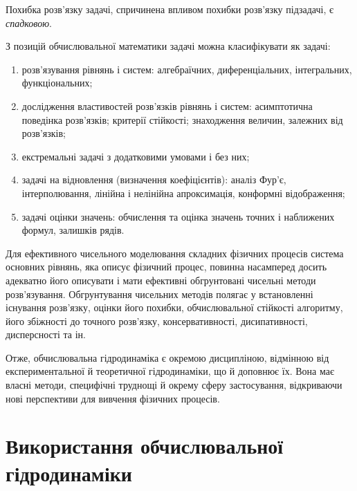 \begin{definition}
    Похибка розв'язку задачі, спричинена впливом похибки роз\-в'яз\-ку підзадачі, є \textit{спадковою}.
\end{definition}

З позицій обчислювальної математики задачі можна класифікувати як задачі: 
\begin{enumerate}
    \item розв'язування рівнянь і систем: алгебраїчних, диференціальних, інтегральних, функціональних; 
    \item дослідження властивостей розв'язків рівнянь і систем: асимптотична поведінка розв'язків; критерії стійкості; знаходження величин, залежних від розв'язків; 
    \item екстремальні задачі з додатковими умовами і без них; 
    \item задачі на відновлення (визначення коефіцієнтів): аналіз Фур'є, інтерполювання, лінійна і нелінійна апроксимація, конформні відображення;
    \item задачі оцінки значень: обчислення та оцінка значень точних і наближених формул, залишків рядів.
\end{enumerate}

Для ефективного чисельного моделювання складних фізичних процесів система основних рівнянь, яка описує фізичний процес, повинна насамперед досить адекватно його описувати і мати ефективні обгрунтовані чисельні методи розв'язування. Обгрунтування чисельних методів полягає у встановленні існування розв'язку, оцінки його похибки, обчислювальної стійкості алгоритму, його збіжності до точного розв'язку, консервативності, дисипативності, дисперсності та ін. \medskip

Отже, обчислювальна гідродинаміка є окремою дисципліною, відмінною від експериментальної й теоретичної гідродинаміки, що й доповнює їх. Вона має власні методи, специфічні труднощі й окрему сферу застосування, відкриваючи нові перспективи для вивчення фізичних процесів.

\section{Використання обчислювальної гідродинаміки}

